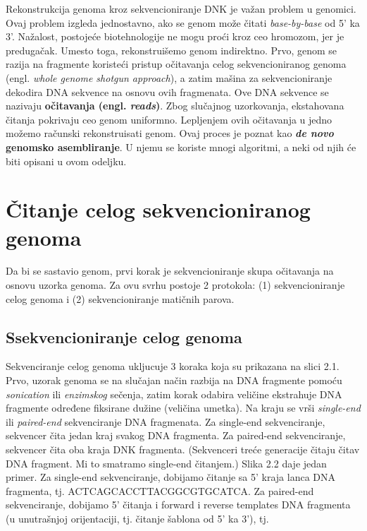 \documentclass[12pt,oneside]{memoir}
\begin{document}
Rekonstrukcija genoma kroz sekvencioniranje DNK je važan problem u genomici. Ovaj problem izgleda jednostavno, ako se genom može čitati \textit{base-by-base} od 5' ka 3'. Nažalost, postojeće biotehnologije ne mogu proći kroz ceo hromozom, jer je predugačak. Umesto toga, rekonstruišemo genom indirektno. Prvo, genom se razija na fragmente koristeći pristup očitavanja celog sekvencioniranog genoma (engl. \textit{whole genome shotgun approach}), a zatim mašina za sekvencioniranje dekodira DNA sekvence na osnovu ovih fragmenata. Ove DNA sekvence se nazivaju \textbf{očitavanja (engl. \textit{reads})}. Zbog slučajnog uzorkovanja, ekstahovana čitanja pokrivaju ceo genom uniformno. Lepljenjem ovih očitavanja u jedno možemo računski rekonstruisati genom. Ovaj proces je poznat kao \textbf{\textit{de novo} genomsko asembliranje}. U njemu se koriste mnogi algoritmi, a neki od njih će biti opisani u ovom odeljku. 

\section{Čitanje celog sekvencioniranog genoma}

Da bi se sastavio genom, prvi korak je sekvencioniranje skupa očitavanja na osnovu uzorka genoma. Za ovu svrhu postoje 2 protokola: (1) sekvencioniranje celog genoma i (2) sekvencioniranje matičnih parova.

\subsection{Ssekvencioniranje celog genoma}

Sekvenciranje celog genoma ukljucuje 3 koraka koja su prikazana na slici 2.1.\\

Prvo, uzorak genoma se na slučajan način razbija na DNA fragmente pomoću \textit{sonication} ili \textit{enzimskog} sečenja, zatim korak odabira veličine ekstrahuje DNA fragmente određene fiksirane dužine (veličina umetka). Na kraju se vrši \textit{single-end} ili \textit{paired-end} sekvenciranje DNA fragmenata. Za single-end sekvenciranje, sekvencer čita jedan kraj svakog DNA fragmenta. Za paired-end sekvenciranje, sekvencer čita oba kraja DNK fragmenta. (Sekvenceri treće generacije čitaju čitav DNA fragment. Mi to smatramo single-end čitanjem.) Slika 2.2 daje jedan primer. Za single-end sekvenciranje, dobijamo čitanje sa 5' kraja lanca DNA fragmenta, tj. ACTCAGCACCTTACGGCGTGCATCA. Za paired-end sekvenciranje, dobijamo 5' čitanja i forward i reverse templates DNA fragmenta (u unutrašnjoj orijentaciji, tj. čitanje šablona od 5' ka 3'), tj.
\end{document}
